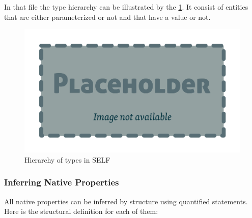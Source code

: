 \documentclass[11pt,a4paper,twoside,openright,titlepage,numbers=noenddot,headinclude,cleardoublepage=empty,openany]{scrreprt}
\theoremstyle{plain}
\theoremstyle{definition}
\theoremstyle{remark}
\begin{document}
In that file the type hierarchy can be illustrated by the
\cref{fig:hierarchy}. It consist of entities that are either
parameterized or not and that have a value or not.

\begin{figure}
\hypertarget{fig:hierarchy}{%
\centering
\includegraphics{./tex2pdf.-0b80fea6fd6da7f9/85c5abcb21612ede4db12ac6fcfd32ed24ed57eb.pdf}
\caption{Hierarchy of types in SELF}\label{fig:hierarchy}
}
\end{figure}

\hypertarget{inferring-native-properties}{%
\subsubsection{Inferring Native
Properties}\label{inferring-native-properties}}

All native properties can be inferred by structure using quantified
statements. Here is the structural definition for each of them:
\end{document}
